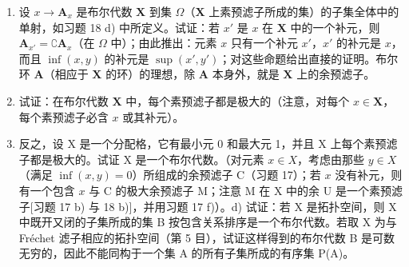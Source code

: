 \begin{enumerate}
\def\labelenumi{\alph{enumi})}
\item
  设 \(x \to \mathbf{A}_x\) 是布尔代数 \(\mathbf{X}\) 到集 \(\Omega\)（\(\mathbf{X}\) 上素预滤子所成的集）的子集全体中的单射，如习题 18 d) 中所定义。试证：若 \(x'\) 是 \(x\) 在 \(\mathbf{X}\) 中的一个补元，则 \(\mathbf{A}_{x'} = \complement \mathbf{A}_x\)（在 \(\Omega\) 中）；由此推出：元素 \(x\) 只有一个补元 \(x'\)，\(x'\) 的补元是 \(x\)，而且 \(\inf (x, y)\) 的补元是 \(\sup (x', y')\)；对这些命题给出直接的证明。布尔环 \(\mathbf{A}\)（相应于 \(\mathbf{X}\) 的环）的理想，除 \(\mathbf{A}\) 本身外，就是 \(\mathbf{X}\) 上的余预滤子。
\item
  试证：在布尔代数 \(\mathbf{X}\) 中，每个素预滤子都是极大的（注意，对每个 \(x \in \mathbf{X}\)，每个素预滤子必含 \(x\) 或其补元）。
\item
  反之，设 X 是一个分配格，它有最小元 0 和最大元 1，并且 X 上每个素预滤子都是极大的。试证 X 是一个布尔代数。（对元素 \(x \in X\)，考虑由那些 \(y \in X\)（满足 \(\inf(x, y) = 0\)）所组成的余预滤子 C（习题 17）；若 \(x\) 没有补元，则有一个包含 \(x\) 与 C 的极大余预滤子 M；注意 M 在 X 中的余 U 是一个素预滤子{[}习题 17 b) 与 18 b){]}，并用习题 17 f)）。d) 试证：若 X 是拓扑空间，则 X 中既开又闭的子集所成的集 B 按包含关系排序是一个布尔代数。若取 X 为与 Fréchet 滤子相应的拓扑空间（第 5 目），试证这样得到的布尔代数 B 是可数无穷的，因此不能同构于一个集 A 的所有子集所成的有序集 P(A)。
\end{enumerate}
\relax{}
